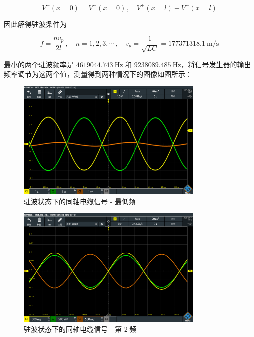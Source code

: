 \documentclass{customDoc}
\begin{document}
\begin{equation}
    V^+(x = 0) = V^-(x = 0) \,,\quad V^+(x = l) + V^-(x = l)
\end{equation}

因此解得驻波条件为

\begin{equation}
    f = \frac{nv_p}{2l}\,,\quad n = 1, 2, 3, \cdots\,,\quad v_p = \frac{1}{\sqrt{LC}} = \SI{177371318.1}{\metre/\second}
\end{equation}

最小的两个驻波频率是 $\SI{4619044.743}{\hertz}$ 和 $\SI{9238089.485}{\hertz}$，将信号发生器的输出频率调节为这两个值，测量得到两种情况下的图像如图所示：

\begin{figure}[H]
    \centering
    \includegraphics[width=0.8\textwidth]{SCR08.PNG}
    \caption{驻波状态下的同轴电缆信号 - 最低频}
    \label{fig:standing_wave_1}
\end{figure}

\begin{figure}[H]
    \centering
    \includegraphics[width=0.8\textwidth]{SCR09.PNG}
    \caption{驻波状态下的同轴电缆信号 - 第 2 频}
    \label{fig:standing_wave_2}
\end{figure}
\end{document}

